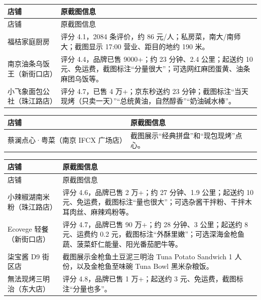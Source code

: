 \endgroup
{}
\begingroup
\small
\setlength{\tabcolsep}{4pt}
\renewcommand{\arraystretch}{1.18}
\begin{longtable}{>{\RaggedRight\arraybackslash}p{}>{\RaggedRight\arraybackslash}p{}}
\toprule
店铺 & 原截图信息 \\
\midrule
\endfirsthead
\toprule
店铺 & 原截图信息 \\
\midrule
\endhead
\bottomrule
\endfoot
福桔家庭厨房 & 评分 4.1，2084 条评价，约 86 元/人；私房菜，南大/南师大；截图显示 17:00 营业、距目的地约 190 米。 \\
\midrule
南京油条乌饭王（新街口店） & 评分 4.4，品牌已售 9000+；约 23 分钟、2.4 公里；起送约 10 元、免运费，截图标注“分量很大”；可选网红麻团蛋黄、油条麻团乌饭等。 \\
\midrule
小飞象面包公社（珠江路店） & 评分 4.7，已售 4 万+；京东秒送约 23 分钟；截图标注“当天现烤（只卖一天）”“总统黄油，自然醇香”“奶油碱水棒”。 \\
\end{longtable}
\endgroup
{}
\begingroup
\small
\setlength{\tabcolsep}{4pt}
\renewcommand{\arraystretch}{1.18}
\begin{longtable}{>{\RaggedRight\arraybackslash}p{}>{\RaggedRight\arraybackslash}p{}}
\toprule
店铺 & 原截图信息 \\
\midrule
蔡澜点心·粤菜（南京 IFCX 广场店） & 截图展示“经典拼盘”和“现包现烤”点心。 \\
\bottomrule
\end{longtable}
\endgroup
{}
\begingroup
\small
\setlength{\tabcolsep}{4pt}
\renewcommand{\arraystretch}{1.18}
\begin{longtable}{>{\RaggedRight\arraybackslash}p{}>{\RaggedRight\arraybackslash}p{}}
\toprule
店铺 & 原截图信息 \\
\midrule
\endfirsthead
\toprule
店铺 & 原截图信息 \\
\midrule
\endhead
\bottomrule
\endfoot
小辣椒湖南米粉（珠江路店） & 评分 4.6，品牌已售 2 万+；约 27 分钟、1.9 公里；起送约 10 元、免运费，截图标注“量也很大”；可选杂酱干拌粉、干拌木耳肉丝、麻辣鸡粉等。 \\
\midrule
Ecovege 轻餐（新街口店） & 评分 4.7，品牌已售 90 万+；约 28 分钟、3 公里；起送约 8 元、运费约 0.2 元，截图标注“外酥里嫩”；可选深海金枪鱼蔬、菠菜虾仁能量、阳光番茄肥牛等。 \\
\midrule
柒宝酱 D9 街区店 & 截图展示金枪鱼土豆泥三明治 Tuna Potato Sandwich 1 人份，以及金枪鱼至味碗 Tuna Bowl 黑米杂粮饭。 \\
\midrule
無法现烤三明治（东大店） & 评分 4.8，品牌已售 1 万+；起送约 3 元、免运费，截图标注“分量也多”。 \\
\end{longtable}
\endgroup
{}
